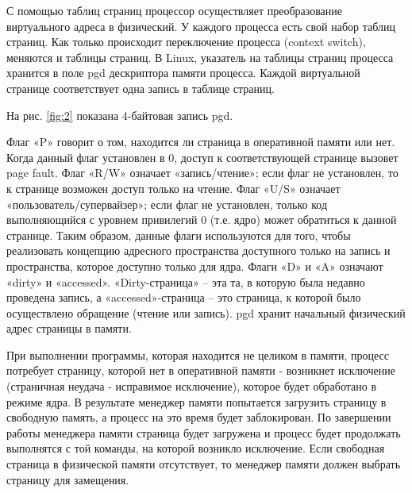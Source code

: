 \newpage


С помощью таблиц страниц процессор осуществляет 
преобразование виртуального адреса в физический. 
У каждого процесса есть свой набор таблиц страниц.
Как только происходит переключение процесса (context switch), меняются и таблицы страниц. 
В Linux, указатель на таблицы страниц процесса хранится в поле pgd дескриптора памяти процесса. 
Каждой виртуальной странице соответствует одна запись в таблице страниц.

На рис. \ref{fig:2} показана 4-байтовая запись pgd.

\begin{figure}[ht!]
\end{figure}

Флаг «P» говорит о том, находится ли страница в оперативной памяти или нет.
Когда данный флаг установлен в 0, доступ к соответствующей странице вызовет page fault.
Флаг «R/W» означает «запись/чтение»; если флаг не установлен, то к странице возможен доступ только на чтение.
Флаг «U/S» означает «пользователь/супервайзер»; если флаг не установлен, только код выполняющийся 
с уровнем привилегий 0 (т.е. ядро) может обратиться к данной странице.
Таким образом, данные флаги используются для того, чтобы реализовать концепцию адресного 
пространства доступного только на запись и пространства, которое доступно только для ядра.
Флаги «D» и «A» означают «dirty» и «accessed». «Dirty-страница» – эта та, в которую была недавно проведена запись, 
а «accessed»-страница – это страница, к которой было осуществлено обращение (чтение или запись). 
pgd хранит начальный физический адрес страницы в памяти.

При выполнении программы, которая находится не целиком в памяти, процесс потребует страницу, 
которой нет в оперативной памяти - возникнет исключение (страничная неудача - исправимое исключение), 
которое будет обработано в режиме ядра. В результате менеджер памяти попытается загрузить страницу 
в свободную память, а процесс на это время будет заблокирован. По завершении работы менеджера памяти страница
будет загружена и процесс будет продолжать выполнятся с той команды, на которой возникло исключение. 
Если свободная страница в физической памяти отсутствует, то менеджер памяти должен выбрать страницу для замещения.

